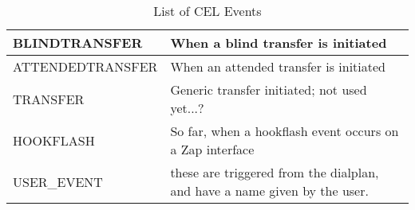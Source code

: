 \begin{table}[h]
\begin{tabular}{ | l | p{10cm} | }
    BLINDTRANSFER    & When a blind transfer is initiated                                        \\ \hline
    ATTENDEDTRANSFER & When an attended transfer is initiated                                    \\ \hline
    TRANSFER         & Generic transfer initiated; not used yet...?                              \\ \hline
    HOOKFLASH        & So far, when a hookflash event occurs on a Zap interface                  \\ \hline
    USER\_EVENT      & these are triggered from the dialplan, and have a name given by the user. \\
    \hline
  \end{tabular}
  \caption{List of CEL Events}
  \label{event_table}
\end{table}


